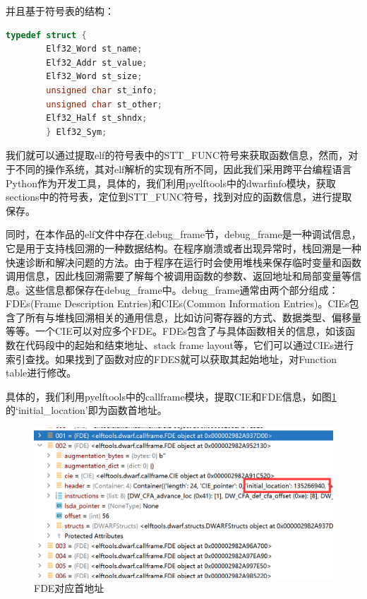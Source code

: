 \documentclass[UTF8,12pt,a4paper,twoside]{ctexart}
\numberwithin{figure}{section}
\begin{document}
\par 并且基于符号表的结构：
\begin{lstlisting}[language=C]
    typedef struct { 
        Elf32_Word st_name; 
        Elf32_Addr st_value; 
        Elf32_Word st_size; 
        unsigned char st_info; 
        unsigned char st_other; 
        Elf32_Half st_shndx; 
        } Elf32_Sym;
\end{lstlisting}
\par 我们就可以通过提取elf的符号表中的STT\_FUNC符号来获取函数信息，然而，对于不同的操作系统，其对elf解析的实现有所不同，因此我们采用跨平台编程语言Python作为开发工具，具体的，我们利用pyelftools中的dwarfinfo模块，获取sections中的符号表，定位到STT\_FUNC符号，找到对应的函数信息，进行提取保存。
\par 同时，在本作品的elf文件中存在.debug\_frame节，debug\_frame是一种调试信息，它是用于支持栈回溯的一种数据结构。在程序崩溃或者出现异常时，栈回溯是一种快速诊断和解决问题的方法。由于程序在运行时会使用堆栈来保存临时变量和函数调用信息，因此栈回溯需要了解每个被调用函数的参数、返回地址和局部变量等信息。这些信息都保存在debug\_frame中。debug\_frame通常由两个部分组成：FDEs(Frame Description Entries)和CIEs(Common Information Entries)。CIEs包含了所有与堆栈回溯相关的通用信息，比如访问寄存器的方式、数据类型、偏移量等等。一个CIE可以对应多个FDE。FDEs包含了与具体函数相关的信息，如该函数在代码段中的起始和结束地址、stack frame layout等，它们可以通过CIEs进行索引查找。如果找到了函数对应的FDES就可以获取其起始地址，对Function table进行修改。
\par 具体的，我们利用pyelftools中的callframe模块，提取CIE和FDE信息，如图\ref{id}的‘initial\_location’即为函数首地址。
\begin{figure}
    \centering
    \includegraphics[scale=0.3]{graph/A.png}
    \caption{FDE对应首地址}
    \label{id}
\end{figure}
\end{document}
